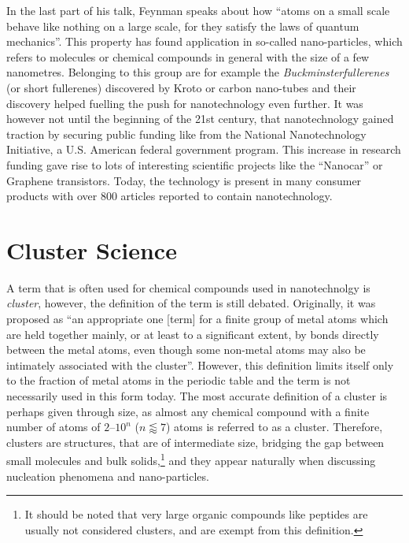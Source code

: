 In the last part of his talk, Feynman speaks about how ``atoms on a small scale
behave like nothing on a large scale, for they satisfy the laws of quantum
mechanics''. This property has found application in so-called nano-particles,
which refers to molecules or chemical compounds in general with the size of a
few nanometres. Belonging to this group are for example the
\emph{Buckminsterfullerenes} (or short fullerenes) discovered by
Kroto\autocite{Kroto_C60Buckminsterfullerene_1985} or carbon
nano-tubes\autocite{Iijima_Helicalmicrotubulesgraphitic_1991} and their
discovery helped fuelling the push for nanotechnology even further. It was
however not until the beginning of the 21st century, that nanotechnology gained
traction by securing public funding like from the National Nanotechnology
Initiative, a U.S. American federal government program. This increase in
research funding gave rise to lots of interesting scientific projects like the
``Nanocar''\autocite{Kudernac_Electricallydrivendirectional_2011} or Graphene
transistors.\autocite{Wu_Highfrequencyscaledgraphene_2011} Today, the technology
is present in many consumer products with over 800 articles reported to contain
nanotechnology.\autocite{Vance_Nanotechnologyrealworld_2015}

\section{Cluster Science}
\label{sec:ClusterScience}

A term that is often used for chemical compounds used in nanotechnolgy is
\emph{cluster}, however, the definition of the term is still debated.
Originally, it was proposed as ``an appropriate one [term] for a finite group of
metal atoms which are held together mainly, or at least to a significant extent,
by bonds directly between the metal atoms, even though some non-metal atoms may
also be intimately associated with the
cluster''.\autocite{Cotton_MetalAtomClusters_1964} However, this definition
limits itself only to the fraction of metal atoms in the periodic table and the
term is not necessarily used in this form today. The most accurate definition of
a cluster is perhaps given through size, as almost any chemical compound with a
finite number of atoms of $2$--$10^n$ ($n\lessapprox 7$) atoms is referred to as
a
cluster.\autocite{Johnston_Atomicmolecularclusters_2002,Wales_Energylandscapes_2003}
Therefore, clusters are structures, that are of intermediate size, bridging the
gap between small molecules and bulk solids,\footnote{It should be noted that
very large organic compounds like peptides are usually not considered clusters,
and are exempt from this definition.} and they appear naturally when discussing
nucleation phenomena and nano-particles. 

